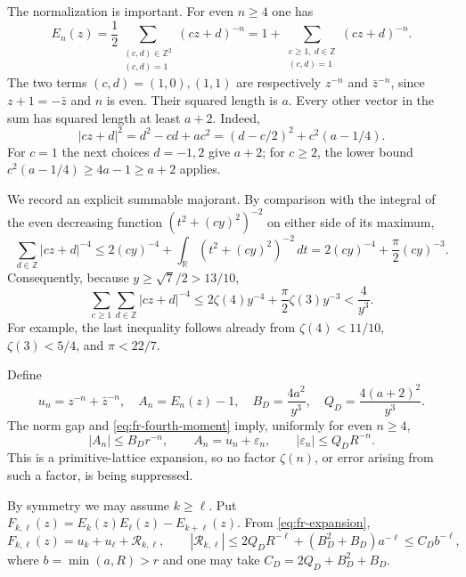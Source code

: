 \documentclass[11pt]{article}
\begin{document}
The normalization is important.  For even $n\geq4$ one has
\begin{equation}
\label{eq:fr-primitive}
 E_n(z)=\frac12\sum_{\substack{(c,d)\in\mathbb Z^2\\(c,d)=1}}
 (cz+d)^{-n}
 =1+\sum_{\substack{c\geq1,\ d\in\mathbb Z\\(c,d)=1}}(cz+d)^{-n}.
\end{equation}
The two terms $(c,d)=(1,0),(1,1)$ are respectively $z^{-n}$ and
$\bar z^{-n}$, since $z+1=-\bar z$ and $n$ is even.  Their squared
length is $a$.  Every other vector in the sum has squared length at least
$a+2$.  Indeed,
\[
 |cz+d|^2=d^2-cd+ac^2=(d-c/2)^2+c^2(a-1/4).
\]
For $c=1$ the next choices $d=-1,2$ give $a+2$; for $c\geq2$,
the lower bound $c^2(a-1/4)\geq4a-1\geq a+2$ applies.

We record an explicit summable majorant.  By comparison with the integral
of the even decreasing function $(t^2+(cy)^2)^{-2}$ on either side of its
maximum,
\[
 \sum_{d\in\mathbb Z}|cz+d|^{-4}
 \leq 2(cy)^{-4}+\int_{\mathbb R}(t^2+(cy)^2)^{-2}\,dt
 =2(cy)^{-4}+\frac\pi2(cy)^{-3}.
\]
Consequently, because $y\geq\sqrt7/2>13/10$,
\begin{equation}
\label{eq:fr-fourth-moment}
 \sum_{c\geq1}\sum_{d\in\mathbb Z}|cz+d|^{-4}
 \leq 2\zeta(4)y^{-4}+\frac\pi2\zeta(3)y^{-3}
 <\frac4{y^3}.
\end{equation}
For example, the last inequality follows already from
$\zeta(4)<11/10$, $\zeta(3)<5/4$, and $\pi<22/7$.

Define
\[
 u_n=z^{-n}+\bar z^{-n},\quad A_n=E_n(z)-1,\quad
 B_D=\frac{4a^2}{y^3},\quad Q_D=\frac{4(a+2)^2}{y^3}.
\]
The norm gap and \eqref{eq:fr-fourth-moment} imply, uniformly for even
$n\geq4$,
\begin{equation}
\label{eq:fr-expansion}
 |A_n|\leq B_Dr^{-n},\qquad
 A_n=u_n+\varepsilon_n,\qquad
 |\varepsilon_n|\leq Q_DR^{-n}.
\end{equation}
This is a primitive-lattice expansion, so no factor $\zeta(n)$, or error
arising from such a factor, is being suppressed.

By symmetry we may assume $k\geq\ell$.  Put
$F_{k,\ell}(z)=E_k(z)E_\ell(z)-E_{k+\ell}(z)$.  From
\eqref{eq:fr-expansion},
\begin{equation}
\label{eq:fr-main-error}
 F_{k,\ell}(z)=u_k+u_\ell+\mathcal R_{k,\ell},\qquad
 |\mathcal R_{k,\ell}|
 \leq2Q_DR^{-\ell}+(B_D^2+B_D)a^{-\ell}
 \leq C_Db^{-\ell},
\end{equation}
where $b=\min(a,R)>r$ and one may take
$C_D=2Q_D+B_D^2+B_D$.
\end{document}
